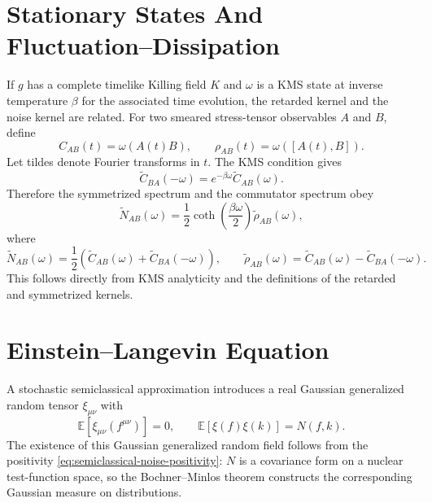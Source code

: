 \section{Stationary States And Fluctuation--Dissipation}

If \(g\) has a complete timelike Killing field \(K\) and \(\omega\) is a KMS
state at inverse temperature \(\beta\) for the associated time evolution,
the retarded kernel and the noise kernel are related.  For two smeared
stress-tensor observables \(A\) and \(B\), define
\[
  C_{AB}(t)=\omega(A(t)B),
  \qquad
  \rho_{AB}(t)=\omega([A(t),B]).
\]
Let tildes denote Fourier transforms in \(t\).  The KMS condition gives
\begin{equation}
  \widetilde C_{BA}(-\omega)
  =
  e^{-\beta\omega}\widetilde C_{AB}(\omega).
  \label{eq:semiclassical-kms-spectral-relation}
\end{equation}
Therefore the symmetrized spectrum and the commutator spectrum obey
\begin{equation}
  \widetilde N_{AB}(\omega)
  =
  \frac12\coth\!\left(\frac{\beta\omega}{2}\right)
  \widetilde\rho_{AB}(\omega),
  \label{eq:semiclassical-fdt}
\end{equation}
where
\[
  \widetilde N_{AB}(\omega)
  =
  \frac12\left(\widetilde C_{AB}(\omega)
  +\widetilde C_{BA}(-\omega)\right),
  \qquad
  \widetilde\rho_{AB}(\omega)
  =
  \widetilde C_{AB}(\omega)
  -\widetilde C_{BA}(-\omega).
\]
This follows directly from KMS analyticity and the definitions of the retarded
and symmetrized kernels.

\section{Einstein--Langevin Equation}

A stochastic semiclassical approximation introduces a real Gaussian
generalized random tensor \(\xi_{\mu\nu}\) with
\begin{equation}
  \mathbb E[\xi_{\mu\nu}(f^{\mu\nu})]=0,
  \qquad
  \mathbb E[\xi(f)\xi(k)]=N(f,k).
  \label{eq:semiclassical-random-source-definition}
\end{equation}
The existence of this Gaussian generalized random field follows from the
positivity \eqref{eq:semiclassical-noise-positivity}: \(N\) is a covariance
form on a nuclear test-function space, so the Bochner--Minlos theorem
constructs the corresponding Gaussian measure on distributions.

